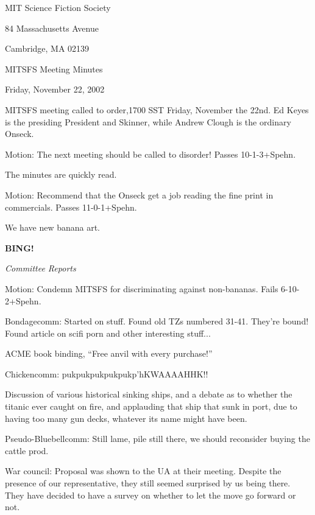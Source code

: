 \documentclass[12pt]{article}
\newcommand{\bing}{{\bf BING!} }
\newcommand{\goto}[1]{\bing \vskip 12pt \centerline{{\em{#1}}}}
\begin{document}
\begin{center}

MIT Science Fiction Society 

84 Massachusetts Avenue

Cambridge, MA 02139

\vspace{12pt}

MITSFS Meeting Minutes 

Friday, November 22, 2002

\end{center}

\vspace{18pt}

\setlength{\parskip}{6pt}

\noindent
MITSFS meeting called to order,1700 SST Friday, November the 22nd.  Ed Keyes is the presiding President and Skinner, while Andrew Clough is the ordinary Onseck.

Motion:  The next meeting should be called to disorder!  Passes 10-1-3+Spehn.

The minutes are quickly read.

Motion:  Recommend that the Onseck get a job reading the fine print in commercials.  Passes 11-0-1+Spehn.

We have new banana art.

\goto{Committee Reports}

Motion:  Condemn MITSFS for discriminating against non-bananas.  Fails 6-10-2+Spehn.

Bondagecomm:  Started on stuff.  Found old TZs numbered 31-41.  They're bound!  Found article on scifi porn and other interesting stuff...

ACME book binding, ``Free anvil with every purchase!''

Chickencomm:  pukpukpukpukpukp'hKWAAAAHHK!!

Discussion of various historical sinking ships, and a debate as to whether the titanic ever caught on fire, and applauding that ship that sunk in port, due to having too many gun decks, whatever its name might have been.

Pseudo-Bluebellcomm:  Still lame, pile still there, we should reconsider buying the cattle prod.

War council: Proposal was shown to the UA at their meeting.  Despite the presence of our representative, they still seemed surprised by us being there.  They have decided to have a survey on whether to let the move go forward or not.
\end{document}
